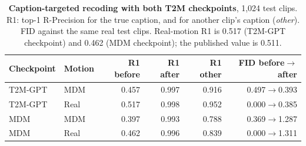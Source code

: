 \begin{table}[t]\centering\footnotesize\setlength{\tabcolsep}{3.5pt}
\setlength{\tabcolsep}{2.8pt}\caption{\textbf{Caption-targeted recoding with both T2M checkpoints}, 1,024 test clips. R1: top-1 R-Precision for the true caption, and for another clip's caption (\emph{other}). FID against the same real test clips. Real-motion R1 is 0.517 (T2M-GPT checkpoint) and 0.462 (MDM checkpoint); the published value is 0.511.}\label{tab:targeted}
\begin{tabular}{@{}llrrrr@{}}\toprule
Checkpoint&Motion&R1 before&R1 after&R1 other&FID before$\to$after\\\midrule
T2M-GPT&MDM&0.457&0.997&0.916&0.497$\to$0.393\\
T2M-GPT&Real&0.517&0.998&0.952&0.000$\to$0.385\\
MDM&MDM&0.397&0.993&0.788&0.369$\to$1.287\\
MDM&Real&0.462&0.996&0.839&0.000$\to$1.311\\
\bottomrule\end{tabular}\end{table}
